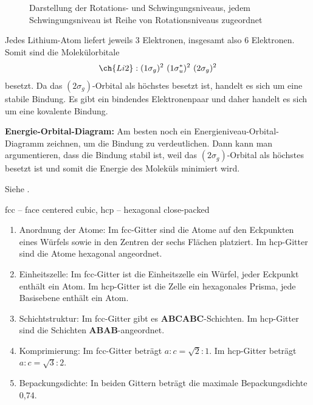 \begin{figure}[H]
\begin{minipage}[b]{.4\linewidth}
      \caption{Darstellung der Rotations- und Schwingungsniveaus, jedem Schwingungsniveau ist Reihe von Rotationsniveaus zugeordnet}
   \end{minipage}
    \end{figure}


\label{q:44}

Jedes Lithium-Atom liefert jeweils 3 Elektronen, insgesamt also 6 Elektronen. 
Somit sind die Molekülorbitale
\[\ch{Li2} : (1\sigma_g)^2 ~ (1\sigma_u^*)^2 ~ (2\sigma_g)^2\]
besetzt. 
Da das $(2\sigma_g)$-Orbital als höchstes besetzt ist, handelt es sich um eine stabile Bindung. 
Es gibt ein bindendes Elektronenpaar und daher handelt es sich um eine kovalente Bindung.

\textbf{Energie-Orbital-Diagram:} Am besten noch ein Energieniveau-Orbital-Diagramm zeichnen, um die Bindung zu verdeutlichen. Dann kann man argumentieren, dass die Bindung stabil ist, weil das $(2\sigma_g)$-Orbital als höchstes besetzt ist und somit die Energie des Moleküls minimiert wird.

\label{q:45}

Siehe .

\label{q:46}

fcc -- face centered cubic, hcp -- hexagonal close-packed

\begin{enumerate}
    \item Anordnung der Atome: Im fcc-Gitter sind die Atome auf den Eckpunkten eines Würfels sowie in den Zentren der sechs Flächen platziert. Im hcp-Gitter sind die Atome hexagonal angeordnet.
    \item Einheitszelle: Im fcc-Gitter ist die Einheitszelle ein Würfel, jeder Eckpunkt enthält ein Atom. Im hcp-Gitter ist die Zelle ein hexagonales Prisma, jede Basisebene enthält ein Atom.
    \item Schichtstruktur: Im fcc-Gitter gibt es \textbf{ABCABC}-Schichten. Im hcp-Gitter sind die Schichten \textbf{ABAB}-angeordnet.
    \item Komprimierung: Im fcc-Gitter beträgt $a:c = \sqrt{2}:1$. Im hcp-Gitter beträgt $a:c = \sqrt{3}:2$.
    \item Bepackungsdichte: In beiden Gittern beträgt die maximale Bepackungsdichte 0,74.
\end{enumerate}

